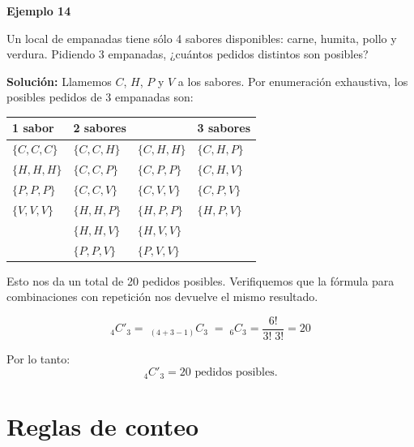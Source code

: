 \documentclass[
  letterpaper,
  DIV=11,
  numbers=noendperiod]{scrreprt}
\begin{document}
\begin{examplebox}

\begin{center}
\textbf{Ejemplo 14}

\end{center}

Un local de empanadas tiene sólo 4 sabores disponibles: carne, humita,
pollo y verdura. Pidiendo 3 empanadas, ¿cuántos pedidos distintos son
posibles?

\textbf{Solución:} Llamemos \(C\), \(H\), \(P\) y \(V\) a los sabores.
Por enumeración exhaustiva, los posibles pedidos de 3 empanadas son:

\begin{flexcenter}

\begin{half}

\begin{longtable}[]{@{}llll@{}}
\toprule\noalign{}
1 sabor & 2 sabores & & 3 sabores \\
\midrule\noalign{}
\endhead
\bottomrule\noalign{}
\endlastfoot
\(\{C,C,C\}\) & \(\{C,C,H\}\) & \(\{C,H,H\}\) & \(\{C,H,P\}\) \\
\(\{H,H,H\}\) & \(\{C,C,P\}\) & \(\{C,P,P\}\) & \(\{C,H,V\}\) \\
\(\{P,P,P\}\) & \(\{C,C,V\}\) & \(\{C,V,V\}\) & \(\{C,P,V\}\) \\
\(\{V,V,V\}\) & \(\{H,H,P\}\) & \(\{H,P,P\}\) & \(\{H,P,V\}\) \\
& \(\{H,H,V\}\) & \(\{H,V,V\}\) & \\
& \(\{P,P,V\}\) & \(\{P,V,V\}\) & \\
\end{longtable}

\end{half}

\end{flexcenter}

Esto nos da un total de 20 pedidos posibles. Verifiquemos que la fórmula
para combinaciones con repetición nos devuelve el mismo resultado.

\[_4C'_3 = \; _{(4+3-1)}C_3 \; = \; _6C_3 = \dfrac{6!}{3! \; 3!} = 20\]

Por lo tanto: \[_4C'_3 = 20 \text{ pedidos posibles.}\]

\end{examplebox}

\hypertarget{reglas-de-conteo}{%
\section{Reglas de conteo}\label{reglas-de-conteo}}
\end{document}
